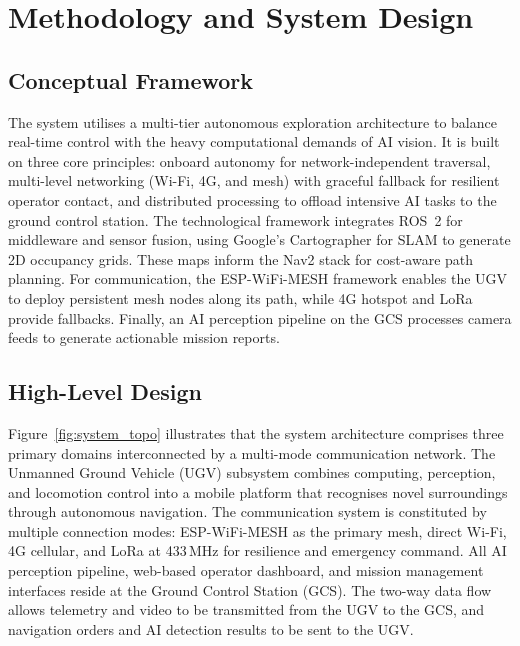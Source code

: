 
\chapter{Methodology and System Design}
\label{ch:method}

\section{Conceptual Framework}
\label{sec:conceptual}

The system utilises a multi-tier autonomous exploration architecture to balance real-time control with the heavy computational demands of AI vision. It is built on three core principles: onboard autonomy for network-independent traversal, multi-level networking (Wi-Fi, 4G, and mesh) with graceful fallback for resilient operator contact, and distributed processing to offload intensive AI tasks to the ground control station. The technological framework integrates ROS~2 \cite{ros2humble} for middleware and sensor fusion, using Google's Cartographer \cite{hess2016} for SLAM to generate 2D occupancy grids. These maps inform the Nav2 stack \cite{nav2dwb} for cost-aware path planning. For communication, the ESP-WiFi-MESH framework \cite{espmesh} enables the UGV to deploy persistent mesh nodes along its path, while 4G hotspot and LoRa provide fallbacks. Finally, an AI perception pipeline on the GCS processes camera feeds to generate actionable mission reports.

\section{High-Level Design}
\label{sec:hld}

Figure~\ref{fig:system_topo} illustrates that the system architecture comprises three primary domains interconnected by a multi-mode communication network. The Unmanned Ground Vehicle (UGV) subsystem combines computing, perception, and locomotion control into a mobile platform that recognises novel surroundings through autonomous navigation. The communication system is constituted by multiple connection modes: ESP-WiFi-MESH as the primary mesh, direct Wi-Fi, 4G cellular, and LoRa at 433\,MHz for resilience and emergency command. All AI perception pipeline, web-based operator dashboard, and mission management interfaces reside at the Ground Control Station (GCS). The two-way data flow allows telemetry and video to be transmitted from the UGV to the GCS, and navigation orders and AI detection results to be sent to the UGV.

